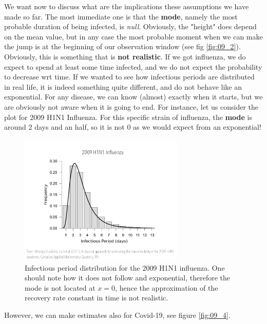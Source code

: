 \documentclass[../main/main.tex]{subfiles}
\begin{document}
We want now to discuss what are the implications these assumptions we have made so far. The most immediate one is that the \textbf{mode}, namely the most probable duration of being infected, is \textit{null}. Obviously, the "height" does depend on the mean value, but in any case the most probable moment when we can make the jump is at the beginning of our observation window (see fig \ref{fig:09_2}). Obviously, this is something that is \textbf{not realistic}. If we got influenza, we do expect to spend at least some time infected, and we do not expect the probability to decrease wrt time. If we wanted to see how infectious periods are distributed in real life, it is indeed something quite different, and do not behave like an exponential. For any disease, we can know (almost) exactly when it starts, but we are obviously not aware when it is going to end. For instance, let us consider the plot for 2009 H1N1 Influenza. For this specific strain of influenza, the \textbf{mode} is around 2 days and an half, so it is not 0 as we would expect from an exponential!

\begin{figure}[h!]
\centering
\includegraphics[width=0.7\textwidth]{../lessons/image/09/image03.png}
\caption{\label{fig:09_3} Infectious period distribution for the 2009 H1N1 influenza. One should note how it does not follow and exponential, therefore the mode is not located at $x=0$, hence the approximation of the recovery rate constant in time is not realistic.}
\end{figure}


However, we can make estimates also for Covid-19, see figure \ref{fig:09_4}.
\end{document}
